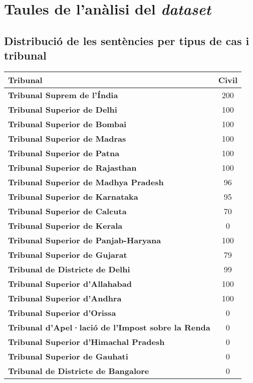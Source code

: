 \chapter{Taules de l'anàlisi del \textit{dataset}}

\section{Distribució de les sentències per tipus de cas i tribunal}
\pagebreak

\begin{table}[H]
    \centering
    \begin{tabular}{|l|c}
      \Xhline{2\arrayrulewidth}
      \textbf{Tribunal} & \textbf{Civil} \\
    \hline
    \textbf{Tribunal Suprem de l'Índia} & 200 \\
    \textbf{Tribunal Superior de Delhi} & 100 \\
    \textbf{Tribunal Superior de Bombai} & 100 \\
    \textbf{Tribunal Superior de Madras} & 100 \\
    \textbf{Tribunal Superior de Patna} & 100 \\
    \textbf{Tribunal Superior de Rajasthan} & 100 \\
    \textbf{Tribunal Superior de Madhya Pradesh} & 96 \\
    \textbf{Tribunal Superior de Karnataka} & 95 \\
    \textbf{Tribunal Superior de Calcuta} & 70 \\
    \textbf{Tribunal Superior de Kerala} & 0 \\
    \textbf{Tribunal Superior de Panjab-Haryana} & 100 \\
    \textbf{Tribunal Superior de Gujarat} & 79 \\
    \textbf{Tribunal de Districte de Delhi} & 99 \\
    \textbf{Tribunal Superior d'Allahabad} & 100 \\
    \textbf{Tribunal Superior d'Andhra} & 100 \\
    \textbf{Tribunal Superior d'Orissa} & 0 \\
    \textbf{Tribunal d'Apel·lació de l'Impost sobre la Renda} & 0 \\
    \textbf{Tribunal Superior d'Himachal Pradesh} & 0 \\
    \textbf{Tribunal Superior de Gauhati} & 0 \\
    \textbf{Tribunal de Districte de Bangalore} & 0 \\

\end{tabular}
\end{table}

